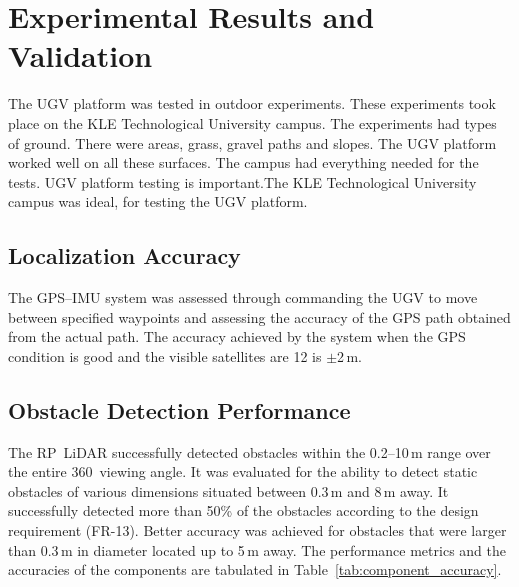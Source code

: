 \documentclass[runningheads]{llncs}
\begin{document}
\section{Experimental Results and Validation}
\label{sec:results}

The UGV platform was tested in outdoor experiments. These experiments took place on the KLE Technological University campus. The experiments had types of ground. There were areas, grass, gravel paths and slopes. The UGV platform worked well on all these surfaces. The campus had everything needed for the tests. UGV platform testing is important.The KLE Technological University campus was ideal, for testing the UGV platform.

 

\subsection{Localization Accuracy}

The GPS–IMU system was assessed through commanding the UGV to move between specified waypoints and assessing the accuracy of the GPS path obtained from the actual path. The accuracy achieved by the system when the GPS condition is good and the visible satellites are 12 is $\pm$2\,m.

\subsection{Obstacle Detection Performance}

The RP~LiDAR successfully detected obstacles within the 0.2--10\,m range over the entire 360\textdegree\ viewing angle. It was evaluated for the ability to detect static obstacles of various dimensions situated between 0.3\,m and 8\,m away. It successfully detected more than 50\% of the obstacles according to the design requirement (FR-13). Better accuracy was achieved for obstacles that were larger than 0.3\,m in diameter located up to 5\,m away. The performance metrics and the accuracies of the components are tabulated in Table~\ref{tab:component_accuracy}.

\begin{table}[htbp]
\caption{Component Performance and Measurement Accuracy}
\label{tab:component_accuracy}
\centering
{}
\end{table}
\end{document}
